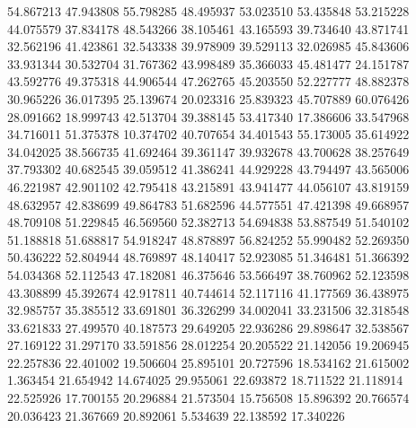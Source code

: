 54.867213
47.943808
55.798285
48.495937
53.023510
53.435848
53.215228
44.075579
37.834178
48.543266
38.105461
43.165593
39.734640
43.871741
32.562196
41.423861
32.543338
39.978909
39.529113
32.026985
45.843606
33.931344
30.532704
31.767362
43.998489
35.366033
45.481477
24.151787
43.592776
49.375318
44.906544
47.262765
45.203550
52.227777
48.882378
30.965226
36.017395
25.139674
20.023316
25.839323
45.707889
60.076426
28.091662
18.999743
42.513704
39.388145
53.417340
17.386606
33.547968
34.716011
51.375378
10.374702
40.707654
34.401543
55.173005
35.614922
34.042025
38.566735
41.692464
39.361147
39.932678
43.700628
38.257649
37.793302
40.682545
39.059512
41.386241
44.929228
43.794497
43.565006
46.221987
42.901102
42.795418
43.215891
43.941477
44.056107
43.819159
48.632957
42.838699
49.864783
51.682596
44.577551
47.421398
49.668957
48.709108
51.229845
46.569560
52.382713
54.694838
53.887549
51.540102
51.188818
51.688817
54.918247
48.878897
56.824252
55.990482
52.269350
50.436222
52.804944
48.769897
48.140417
52.923085
51.346481
51.366392
54.034368
52.112543
47.182081
46.375646
53.566497
38.760962
52.123598
43.308899
45.392674
42.917811
40.744614
52.117116
41.177569
36.438975
32.985757
35.385512
33.691801
36.326299
34.002041
33.231506
32.318548
33.621833
27.499570
40.187573
29.649205
22.936286
29.898647
32.538567
27.169122
31.297170
33.591856
28.012254
20.205522
21.142056
19.206945
22.257836
22.401002
19.506604
25.895101
20.727596
18.534162
21.615002
1.363454
21.654942
14.674025
29.955061
22.693872
18.711522
21.118914
22.525926
17.700155
20.296884
21.573504
15.756508
15.896392
20.766574
20.036423
21.367669
20.892061
5.534639
22.138592
17.340226
